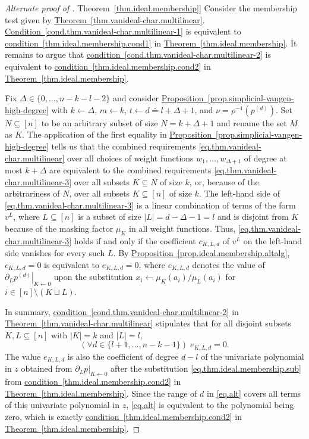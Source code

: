\documentclass[11pt]{article}
\numberwithin{equation}{section}
\theoremstyle{definition}
\theoremstyle{plain}
\newcommand{\expref}[2]{\hyperref[#2]{#1~\ref{#2}}}
\newcommand{\Srepr}{\rho}
\newcommand{\PartialZero}[3]{\left.\partial_{#1} #3\right|_{#2 \gets 0}}
\begin{document}
\begin{proof}[Alternate proof of \expref{Theorem}{thm.ideal.membership}]
Consider the membership test given by \expref{Theorem}{thm.vanideal-char.multilinear}. \expref{Condition}{cond.thm.vanideal-char.multilinear-1} is equivalent to 
\expref{condition}{thm.ideal.membership.cond1} in \expref{Theorem}{thm.ideal.membership}. It remains to argue that \expref{condition}{cond.thm.vanideal-char.multilinear-2} is equivalent to \expref{condition}{thm.ideal.membership.cond2} in \expref{Theorem}{thm.ideal.membership}. 

Fix $\Delta \in \{0,\dots,n-k-l-2\}$ and consider  \expref{Proposition}{prop.simplicial-vangen-high-degree} with $k \gets \Delta$, $m \gets k$, $t \gets d \doteq l+\Delta+1$, and $\nu = \Srepr^{-1}(p^{(d)})$. Set $N \subseteq [n]$ to be an arbitrary subset of size $N=k+\Delta+1$ and rename the set $M$ as $K$. The application of the first equality in \expref{Proposition}{prop.simplicial-vangen-high-degree} tells us that the combined requirements \eqref{eq.thm.vanideal-char.multilinear} over all choices of weight functions \(w_1,\ldots,w_{\Delta+1}\) of degree at most \(k+\Delta\) are equivalent to the combined requirements
\eqref{eq.thm.vanideal-char.multilinear-3} over all subsets $K \subseteq N$ of size $k$, or, because of the arbitrariness of $N$, over all subsets $K \subseteq [n]$ of size $k$. The left-hand side of \eqref{eq.thm.vanideal-char.multilinear-3} is a linear combination of terms of the form $v^L$, where $L \subseteq [n]$ is a subset of size $|L|=d-\Delta-1=l$ and is disjoint from $K$ because of the masking factor $\mu_K$ in all weight functions. Thus, \eqref{eq.thm.vanideal-char.multilinear-3} holds if and only if the coefficient $c_{K,L,d}$ of $v^L$ on the left-hand side vanishes for every such $L$. By \expref{Proposition}{prop.ideal.membership.altalg}, $c_{K,L,d}=0$ is equivalent to $e_{K,L,d}=0$, where $e_{K,L,d}$ denotes the value of $\PartialZero{L}{K}{p^{(d)}}$ upon the substitution $x_i\gets \mu_K(a_i)/\mu_L(a_i)$ for $i \in [n]\setminus (K \sqcup L)$.

In summary, \expref{condition}{cond.thm.vanideal-char.multilinear-2} in
\expref{Theorem}{thm.vanideal-char.multilinear} stipulates that for all disjoint subsets $K,L \subseteq [n]$ with $|K|=k$ and $|L|=l$,
\begin{equation}\label{eq.alt}
(\forall d \in \{l+1,\dots,n-k-1\}) \; e_{K,L,d} = 0.
\end{equation}
The value $e_{K,L,d}$ is also the coefficient of degree $d-l$ of the univariate polynomial in $z$ obtained from $\PartialZero{L}{K}{p}$ after the substitution  \eqref{eq.thm.ideal.membership.sub} from \expref{condition}{thm.ideal.membership.cond2} in \expref{Theorem}{thm.ideal.membership}. Since the range of $d$ in \eqref{eq.alt} covers all terms of this univariate polynomial in $z$, \eqref{eq.alt} is equivalent to the polynomial being zero, which is exactly \expref{condition}{thm.ideal.membership.cond2} in \expref{Theorem}{thm.ideal.membership}.
\end{proof}
\end{document}

